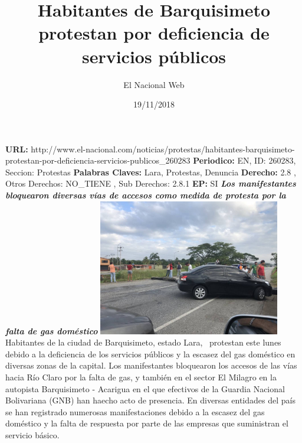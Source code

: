 \documentclass{article}%
\title{\textbf{Habitantes de Barquisimeto protestan por deficiencia de servicios públicos}}%
\author{El Nacional Web}%
\date{19/11/2018}%
\begin{document}
%
\normalsize%
\maketitle%
\textbf{URL: }%
http://www.el{-}nacional.com/noticias/protestas/habitantes{-}barquisimeto{-}protestan{-}por{-}deficiencia{-}servicios{-}publicos\_260283\newline%
%
\textbf{Periodico: }%
EN, %
ID: %
260283, %
Seccion: %
Protestas\newline%
%
\textbf{Palabras Claves: }%
Lara, Protestas, Denuncia\newline%
%
\textbf{Derecho: }%
2.8%
, Otros Derechos: %
NO\_TIENE%
, Sub Derechos: %
2.8.1%
\newline%
%
\textbf{EP: }%
SI\newline%
\newline%
%
\textbf{\textit{Los manifestantes bloquearon diversas vías de accesos como medida de protesta por la falta de gas doméstico}}%
\newline%
\newline%
%
\includegraphics[width=300px]{174.jpg}%
\newline%
%
Habitantes de la ciudad de Barquisimeto, estado Lara,~ protestan este lunes debido a la deficiencia de los servicios públicos y la escasez del gas doméstico en diversas zonas de la capital.%
\newline%
%
Los manifestantes bloquearon los accesos de las vías hacia Río Claro por la falta de gas, y también en el sector El Milagro en la autopista Barquisimeto {-} Acarigua en el que efectivos de la Guardia Nacional Bolivariana (GNB) han haecho acto de presencia.%
\newline%
%
En diversas entidades del país se han registrado numerosas manifestaciones debido a la escasez del gas doméstico y la falta de respuesta por parte de las empresas que suministran el servicio básico.%
\newline%
%
\end{document}
